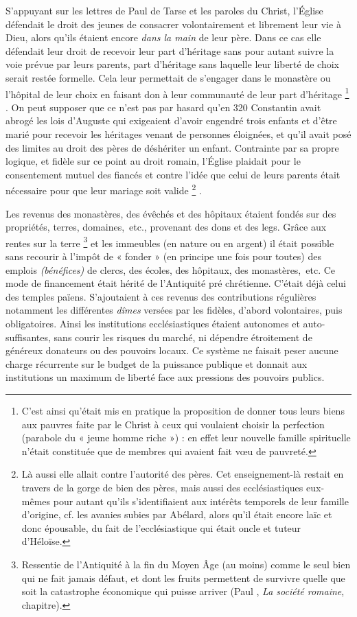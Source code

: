  S'appuyant sur les lettres de Paul de Tarse et les paroles du Christ, l'Église défendait le droit des jeunes de consacrer volontairement et librement leur vie à Dieu, alors qu'ils étaient encore \emph{dans la main} de leur père. Dans ce cas elle défendait leur droit de recevoir leur part d'héritage sans pour autant suivre la voie prévue par leurs parents, part d'héritage sans laquelle leur liberté de choix serait restée formelle. Cela leur permettait de s'engager dans le monastère ou l'hôpital de leur choix en faisant don à leur communauté de leur part d'héritage%
\footnote{C'est ainsi qu'était mis en pratique la proposition de donner tous leurs biens aux pauvres faite par le Christ à ceux qui voulaient choisir la perfection (parabole du « jeune homme riche ») : en effet leur nouvelle famille spirituelle n'était constituée que de membres qui avaient fait vœu de pauvreté.}%
. On peut supposer que ce n'est pas par hasard qu'en 320 Constantin avait abrogé les lois d'Auguste qui exigeaient d'avoir engendré trois enfants et d'être marié pour recevoir les héritages venant de personnes éloignées, et qu'il avait posé des limites au droit des pères de déshériter un enfant. Contrainte par sa propre logique, et fidèle sur ce point au droit romain, l'Église plaidait pour le consentement mutuel des fiancés et contre l'idée que celui de leurs parents était nécessaire pour que leur mariage soit valide%
\footnote{Là aussi elle allait contre l'autorité des pères. Cet enseignement-là restait en travers de la gorge de bien des pères, mais aussi des ecclésiastiques eux-mêmes pour autant qu'ils s'identifiaient aux intérêts temporels de leur famille d'origine, cf. les avanies subies par Abélard, alors qu'il était encore laïc et donc épousable, du fait de l'ecclésiastique qui était oncle et tuteur d'Héloïse.}%
.

 Les revenus des monastères, des évêchés et des hôpitaux étaient fondés sur des propriétés, terres, domaines,~etc., provenant des dons et des legs. Grâce aux rentes sur la terre%
\footnote{Ressentie de l'Antiquité à la fin du Moyen Âge (au moins) comme le seul bien qui ne fait jamais défaut, et dont les fruits permettent de survivre quelle que soit la catastrophe économique qui puisse arriver (Paul , \emph{La société romaine}, chapitre).} 
et les immeubles (en nature ou en argent) il était possible sans recourir à l'impôt de « fonder » (en principe une fois pour toutes) des emplois \emph{(bénéfices)} de clercs, des écoles, des hôpitaux, des monastères,~etc. Ce mode de financement était hérité de l'Antiquité pré chrétienne. C'était déjà celui des temples païens. S'ajoutaient à ces revenus des contributions régulières notamment les différentes \emph{dîmes} versées par les fidèles, d'abord volontaires, puis obligatoires. Ainsi les institutions ecclésiastiques étaient autonomes et auto-suffisantes, sans courir les risques du marché, ni dépendre étroitement de généreux donateurs ou des pouvoirs locaux. Ce système ne faisait peser aucune charge récurrente sur le budget de la puissance publique et donnait aux institutions un maximum de liberté face aux pressions des pouvoirs publics. 

